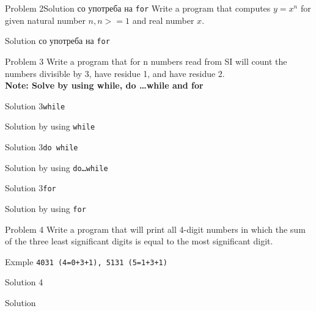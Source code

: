 \begin{frame}[fragile]{Problem 2}{Solution со употреба на \texttt{for}}
Write a program that computes $y = x^n$ for given natural number $n, n>=1$ and
real number $x$.
\pause
\begin{exampleblock}{Solution со употреба на \texttt{for}}

\end{exampleblock}
\end{frame}


\begin{frame}[fragile]{Problem 3}
Write a program that for n numbers read from SI will count the numbers divisible
by 3, have residue 1, and have residue 2.\\
\textbf{Note: Solve by using while, do \ldots while and for}
\end{frame}


\begin{frame}[fragile]{Solution 3}{\texttt{while}}
\begin{exampleblock}{Solution by using \texttt{while}}

\end{exampleblock}
\end{frame}


\begin{frame}[fragile]{Solution 3}{\texttt{do while}}
\begin{exampleblock}{Solution by using \texttt{do\ldots while}}

\end{exampleblock}
\end{frame}


\begin{frame}[fragile]{Solution 3}{\texttt{for}}
\begin{exampleblock}{Solution by using \texttt{for}}

\end{exampleblock}
\end{frame}

\begin{frame}[fragile]{Problem 4}
Write a program that will print all 4-digit numbers in which the sum of the
three least significant digits is equal to the most significant digit.
\begin{exampleblock}{Exmple}
	\texttt{4031 (4=0+3+1), 5131 (5=1+3+1)}
\end{exampleblock}
\end{frame}

\begin{frame}[fragile]{Solution 4}
\begin{exampleblock}{Solution}

\end{exampleblock}
\end{frame}

